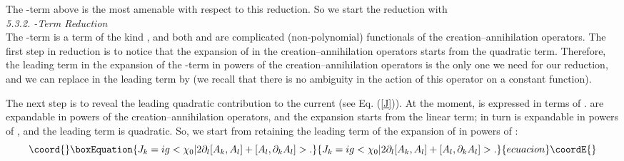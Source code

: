 \documentclass[a4paper,12pt]{article}
\begin{document}
The \coordHE{}-term above is the most amenable with respect to this reduction. 
So we start the reduction with\\

{\it 5.3.2. \coordHE{}-Term Reduction }\\

The \coordHE{}-term is a term of the kind  \coordHE{}, and both 
\coordHE{} and \coordHE{} are complicated 
(non-polynomial) functionals 
of the creation--annihilation operators. The first step in reduction 
is to notice that the expansion of \coordHE{} in the 
creation--annihilation operators starts from the quadratic term. 
Therefore, the leading term in the expansion of the \coordHE{}-term 
in powers of the creation--annihilation operators is 
the only one we need for our reduction, and we can 
replace in the leading term \coordHE{} by \coordHE{} 
(we recall that there is no ambiguity in the action of 
this operator on a constant function).

The next step is to reveal the leading quadratic contribution to the 
current \coordHE{} (see Eq. (\ref{J})).
At the moment, \coordHE{} is expressed in terms of \coordHE{}. \coordHE{} 
are expandable in powers of the creation--annihilation operators, 
and the expansion starts from the 
linear term; \coordHE{} in turn is expandable in powers of \coordHE{}, 
and the leading term is quadratic. So, we start from retaining 
the leading term of the expansion of \coordHE{} 
in powers of \coordHE{}:
\begin{equation}\coord{}\boxEquation{
\label{leadingj}
J_k =ig<\chi_0|2\partial_l[A_k,A_l] + [A_l,\partial_kA_l]>.
}{
J_k =ig<\chi_0|2\partial_l[A_k,A_l] + [A_l,\partial_kA_l]>.
}{ecuacion}\coordE{}\end{equation}
\end{document}
